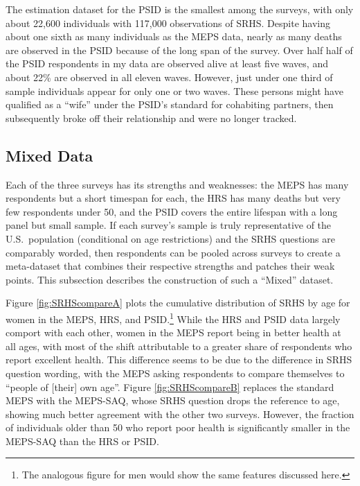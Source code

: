 \documentclass[12pt,pdftex,letterpaper]{article}
\begin{document}
The estimation dataset for the PSID is the smallest among the surveys, with only about 22,600 individuals with 117,000 observations of SRHS.  Despite having about one sixth as many individuals as the MEPS data, nearly as many deaths are observed in the PSID because of the long span of the survey.  Over half half of the PSID respondents in my data are observed alive at least five waves, and about 22\% are observed in all eleven waves.  However, just under one third of sample individuals appear for only one or two waves.  These persons might have qualified as a ``wife'' under the PSID's standard for cohabiting partners, then subsequently broke off their relationship and were no longer tracked.


\subsection{Mixed Data}\label{sec:Mixed}

Each of the three surveys has its strengths and weaknesses: the MEPS has many respondents but a short timespan for each, the HRS has many deaths but very few respondents under 50, and the PSID covers the entire lifespan with a long panel but small sample.  If each survey's sample is truly representative of the U.S.\ population (conditional on age restrictions) and the SRHS questions are comparably worded, then respondents can be pooled across surveys to create a meta-dataset that combines their respective strengths and patches their weak points.  This subsection describes the construction of such a ``Mixed'' dataset.

Figure \ref{fig:SRHScompareA} plots the cumulative distribution of SRHS by age for women in the MEPS, HRS, and PSID.\footnote{The analogous figure for men would show the same features discussed here.}  While the HRS and PSID data largely comport with each other, women in the MEPS report being in better health at all ages, with most of the shift attributable to a greater share of respondents who report excellent health.  This difference seems to be due to the difference in SRHS question wording, with the MEPS asking respondents to compare themselves to ``people of [their] own age''.  Figure \ref{fig:SRHScompareB} replaces the standard MEPS with the MEPS-SAQ, whose SRHS question drops the reference to age, showing much better agreement with the other two surveys.  However, the fraction of individuals older than 50 who report poor health is significantly smaller in the MEPS-SAQ than the HRS or PSID.
\end{document}
